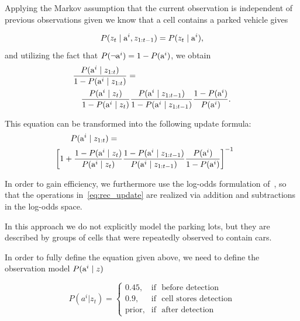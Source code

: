Applying the Markov assumption that the current observation is independent of
previous observations given we know that a cell contains a parked vehicle
gives

\begin{equation}
P(z_{t} \mid {\mbox{a}^i}, z_{1:t-1}) = P(z_{t} \mid {\mbox{a}^i}),
\end{equation}
\noindent
and utilizing the fact that $P(\neg {\mbox{a}^i}) = 1 - P({\mbox{a}^i})$, we obtain
\begin{eqnarray}
\lefteqn{\frac{ P(\v \mid z_{1:t}) }{ 1 - P(\v \mid z_{1:t})} = } \nonumber \\
&&\frac{ P( \v \mid \z)}{ 1 - P(\v \mid \z)}   \frac{ P(\v \mid \y)}{ 1 - P(\v \mid  \y)}   \frac{ 1 - P(\v)}{ P(\v)}.
\end{eqnarray}

\noindent
This equation can be transformed into the following update formula:
\begin{eqnarray}
\label{eq:rec_update}
\hspace{-6mm}\lefteqn{P(\v\mid z_{1:t})=} \nonumber \\
&& \hspace{-10mm} \left[ 1 + \frac{1 - P(\v\mid \z)}{P(\v \mid \z)}
\frac{1 - P(\v \mid \y)}{P(\v \mid \y)}   \frac{P(\v)}{1 - P(\v)}  \right]^{-1}
\end{eqnarray}
\noindent

In order to gain efficiency, we furthermore use the log-odds  formulation of~\citet{occupancy_grids}, so that the
operations in~\eqref{eq:rec_update} are realized via addition and
subtractions in the log-odds space.

In this approach we do not explicitly model the parking lots, but they are
described by groups of cells that were repeatedly observed to contain cars.

In order to fully define the equation given above, we need to define the
observation model $P({\mbox{a}^i} \mid z)$

\begin{equation}
\label{eq:observation_model}
P(a^i | z_t) = \begin{cases} 0.45, & \mbox{if } \mbox{ before detection} \\ 0.9, & \mbox{if } \mbox{ cell stores detection} \\ \mbox{prior}, & \mbox{if } \mbox{ after detection} \end{cases}
\end{equation}

